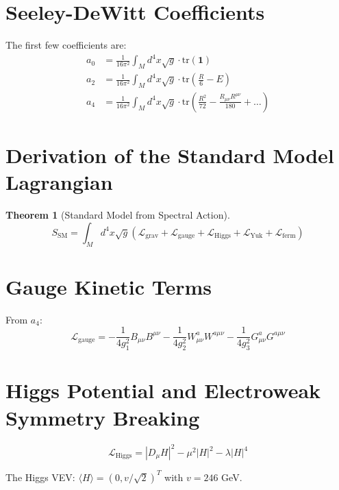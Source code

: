 \documentclass[11pt,a4paper,openright]{book}
\theoremstyle{plain}
\newtheorem{theorem}{Theorem}[chapter]
\theoremstyle{definition}
\newcommand{\SM}{\mathrm{SM}}
\newcommand{\tr}{\mathrm{tr}}
\begin{document}
\section{Seeley-DeWitt Coefficients}

The first few coefficients are:
\begin{align}
a_0 &= \frac{1}{16\pi^2} \int_M d^4x \sqrt{g} \cdot \tr(\mathbf{1}) \\
a_2 &= \frac{1}{16\pi^2} \int_M d^4x \sqrt{g} \cdot \tr\left(\frac{R}{6} - E\right) \\
a_4 &= \frac{1}{16\pi^2} \int_M d^4x \sqrt{g} \cdot \tr\left(\frac{R^2}{72} - \frac{R_{\mu\nu}R^{\mu\nu}}{180} + \ldots\right)
\end{align}

\section{Derivation of the Standard Model Lagrangian}

\begin{theorem}[Standard Model from Spectral Action]
\begin{equation}
S_{\SM} = \int_M d^4x \sqrt{g} \left(\mathcal{L}_{\mathrm{grav}} + \mathcal{L}_{\mathrm{gauge}} + \mathcal{L}_{\mathrm{Higgs}} + \mathcal{L}_{\mathrm{Yuk}} + \mathcal{L}_{\mathrm{ferm}}\right)
\end{equation}
\end{theorem}

\section{Gauge Kinetic Terms}

From $a_4$:
\begin{equation}
\mathcal{L}_{\mathrm{gauge}} = -\frac{1}{4g_1^2}B_{\mu\nu}B^{\mu\nu} - \frac{1}{4g_2^2}W_{\mu\nu}^a W^{a\mu\nu} - \frac{1}{4g_3^2}G_{\mu\nu}^a G^{a\mu\nu}
\end{equation}

\section{Higgs Potential and Electroweak Symmetry Breaking}

\begin{equation}
\mathcal{L}_{\mathrm{Higgs}} = |D_\mu H|^2 - \mu^2|H|^2 - \lambda|H|^4
\end{equation}

The Higgs VEV: $\langle H \rangle = (0, v/\sqrt{2})^T$ with $v = 246$ GeV.
\end{document}

